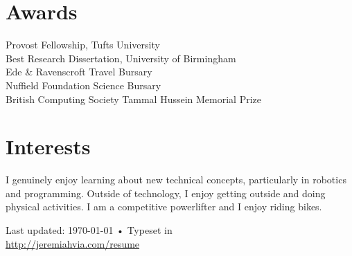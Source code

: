 \documentclass[10pt, letter]{article}
\newcommand{\years}[1]{\marginnote{\scriptsize #1}}
\begin{document}
\section*{Awards}
\years{2012}
Provost Fellowship, Tufts University\\
Best Research Dissertation, University of Birmingham\\
\years{2011}
Ede \& Ravenscroft Travel Bursary\\
Nuffield Foundation Science Bursary\\
\years{2010}
British Computing Society Tammal Hussein Memorial Prize

\section*{Interests}
I genuinely enjoy learning about new technical concepts, particularly
in robotics and programming. Outside of technology, I enjoy getting
outside and doing physical activities. I am a competitive powerlifter
and I enjoy riding bikes.

\vfill{}
\begin{center}
  {\scriptsize  Last updated: \today\- •\-
    Typeset in \href{http://nitens.org/taraborelli/cvtex}{
      \XeTeX }\\
    \href{http://jeremiahvia.com/cv/resume.pdf}{http://jeremiahvia.com/resume}}
\end{center}
\end{document}

